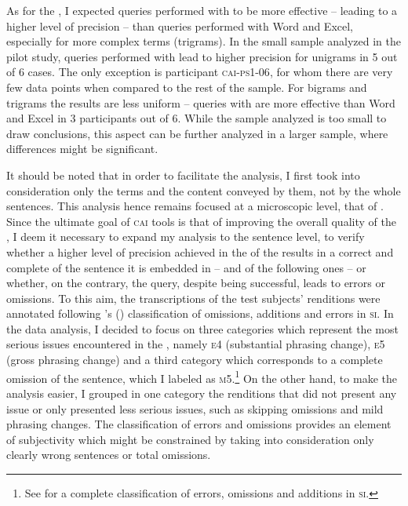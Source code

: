 \documentclass[output=paper]{langsci/langscibook}
\begin{document}
As for the , I expected queries performed with  to be more effective – leading to a higher level of precision – than queries performed with Word and Excel, especially for more complex terms (trigrams). In the small sample analyzed in the pilot study, queries performed with  lead to higher precision for unigrams in 5 out of 6 cases. The only exception is participant \textsc{cai}-\textsc{ps1-06}, for whom there are very few data points when compared to the rest of the sample. For bigrams and trigrams the results are less uniform -- queries with  are more effective than Word and Excel in 3 participants out of 6. While the sample analyzed is too small to draw conclusions, this aspect can be further analyzed in a larger sample, where differences might be significant.

It should be noted that in order to facilitate the analysis, I first took into consideration only the terms and the content conveyed by them, not by the whole sentences. This analysis hence remains focused at a microscopic level, that of . Since the ultimate goal of \textsc{cai} tools is that of improving the overall quality of the , I deem it necessary to expand my analysis to the sentence level, to verify whether a higher level of precision achieved in the  of the  results in a correct and complete  of the sentence it is embedded in – and of the following ones – or whether, on the contrary, the query, despite being successful, leads to errors or omissions. To this aim, the transcriptions of the test subjects’ renditions were annotated following \citeauthor{Barik1971}’s (\citeyear{Barik1971}) classification of omissions, additions and errors in \textsc{si}. In the data analysis, I decided to focus on three categories which represent the most serious issues encountered in the , namely \textsc{e4} (substantial phrasing change), \textsc{e5} (gross phrasing change) and a third category which corresponds to a complete omission of the sentence, which I labeled as \textsc{m5}.\footnote{See \citet{Barik1971} for a complete classification of errors, omissions and additions in \textsc{si}.} On the other hand, to make the analysis easier, I grouped in one category the renditions that did not present any issue or only presented less serious issues, such as skipping omissions and mild phrasing changes. The classification of errors and omissions provides an element of subjectivity which might be constrained by taking into consideration only clearly wrong sentences or total omissions.
\end{document}
